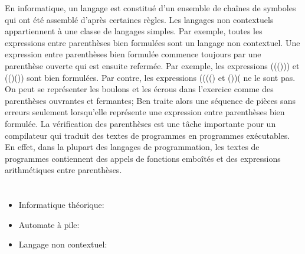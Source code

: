 {{En informatique, un langage est constitué d’un ensemble de chaînes de symboles qui ont été assemblé d’après certaines règles. Les langages non contextuels appartiennent à une classe de langages simples. Par exemple, toutes les expressions entre parenthèses bien formulées sont un langage non contextuel. Une expression entre parenthèses bien formulée commence toujours par une parenthèse ouverte qui est ensuite refermée. Par exemple, les expressions ((())) et (()()) sont bien formulées. Par contre, les expressions (((() et ())( ne le sont pas. On peut se représenter les boulons et les écrous dans l’exercice comme des parenthèses ouvrantes et fermantes; Ben traite alors une séquence de pièces sans erreurs seulement lorsqu’elle représente une expression entre parenthèses bien formulée. La vérification des parenthèses est une tâche importante pour un compilateur qui traduit des textes de programmes en programmes exécutables. En effet, dans la plupart des langages de programmation, les textes de programmes contiennent des appels de fonctions emboîtés et des expressions arithmétiques entre parenthèses.



\section*{\BrochureWebsitesAndKeywords}
{\raggedright
\begin{itemize}
  \item Informatique théorique: \href{https://fr.wikipedia.org/wiki/Informatique_th\%C3\%A9orique}{}
  \item Automate à pile: \href{https://fr.wikipedia.org/wiki/Automate_\%C3\%A0_pile}{}
  \item Langage non contextuel: \href{https://fr.wikipedia.org/wiki/Langage_alg\%C3\%A9brique}{}
\end{itemize}


}

}{}

\def\AuthorVasigaT{} %
\def\AuthorKinciusV{} %
\def\AuthorLehtimakiT{} %
\def\AuthorBergsveinsdottirL{} %
\def\AuthorWeigendM{} %
\def\AuthorDatzkoC{} %
\def\AuthorDatzkoS{} %
\def\AuthorPelletE{} %

\newpage}{}
